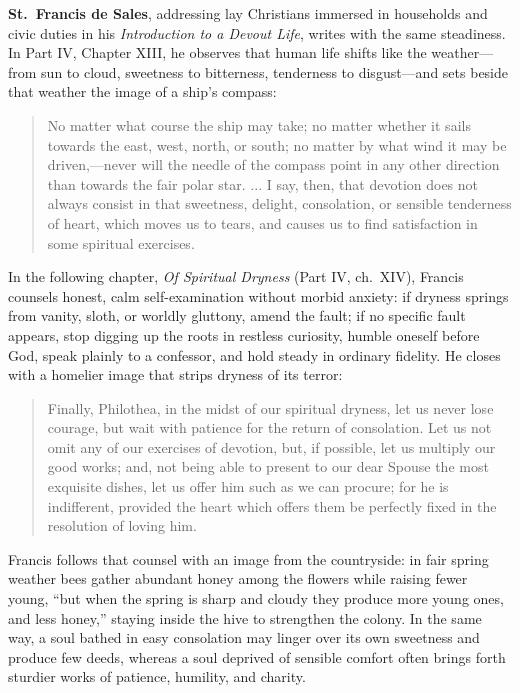 \textbf{St.\ Francis de Sales}, addressing lay Christians immersed in households and civic duties in his \emph{Introduction to a Devout Life}, writes with the same steadiness. In Part IV, Chapter XIII, he observes that human life shifts like the weather---from sun to cloud, sweetness to bitterness, tenderness to disgust---and sets beside that weather the image of a ship's compass:

\begin{quote}
No matter what course the ship may take; no matter whether it sails towards the east, west, north, or south; no matter by what wind it may be driven,---never will the needle of the compass point in any other direction than towards the fair polar star. ... I say, then, that devotion does not always consist in that sweetness, delight, consolation, or sensible tenderness of heart, which moves us to tears, and causes us to find satisfaction in some spiritual exercises.
\end{quote}

In the following chapter, \emph{Of Spiritual Dryness} (Part IV, ch.\ XIV), Francis counsels honest, calm self-examination without morbid anxiety: if dryness springs from vanity, sloth, or worldly gluttony, amend the fault; if no specific fault appears, stop digging up the roots in restless curiosity, humble oneself before God, speak plainly to a confessor, and hold steady in ordinary fidelity. He closes with a homelier image that strips dryness of its terror:

\begin{quote}
Finally, Philothea, in the midst of our spiritual dryness, let us never lose courage, but wait with patience for the return of consolation. Let us not omit any of our exercises of devotion, but, if possible, let us multiply our good works; and, not being able to present to our dear Spouse the most exquisite dishes, let us offer him such as we can procure; for he is indifferent, provided the heart which offers them be perfectly fixed in the resolution of loving him.
\end{quote}

Francis follows that counsel with an image from the countryside: in fair spring weather bees gather abundant honey among the flowers while raising fewer young, ``but when the spring is sharp and cloudy they produce more young ones, and less honey,'' staying inside the hive to strengthen the colony. In the same way, a soul bathed in easy consolation may linger over its own sweetness and produce few deeds, whereas a soul deprived of sensible comfort often brings forth sturdier works of patience, humility, and charity.

